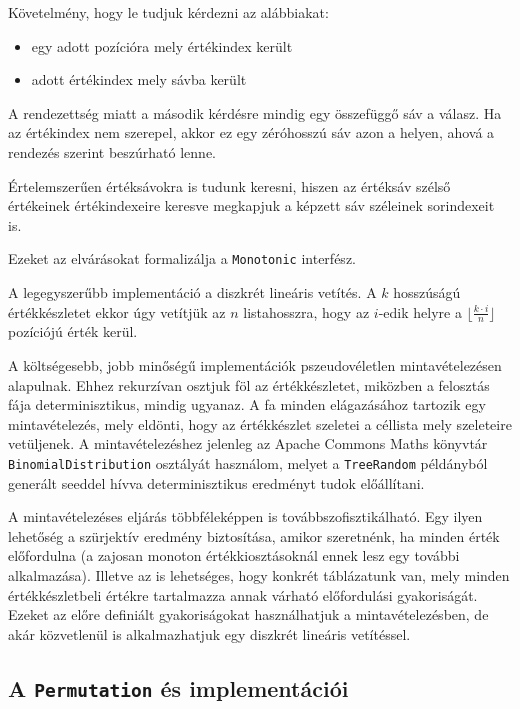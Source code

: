 \documentclass[
    parspace,
    noindent,
    nohyp,
]{elteiktdk}[2023/04/10]
\begin{document}
Követelmény, hogy le tudjuk kérdezni az alábbiakat:

\begin{itemize}
    \item egy adott pozícióra mely értékindex került
    \item adott értékindex mely sávba került
\end{itemize}

A rendezettség miatt a második kérdésre mindig egy összefüggő sáv a válasz. Ha az értékindex nem szerepel, akkor ez egy zéróhosszú sáv azon a helyen, ahová a rendezés szerint beszúrható lenne.

Értelemszerűen értéksávokra is tudunk keresni, hiszen az értéksáv szélső értékeinek értékindexeire keresve megkapjuk a képzett sáv széleinek sorindexeit is.

Ezeket az elvárásokat formalizálja a \texttt{Monotonic} interfész.

A legegyszerűbb implementáció a diszkrét lineáris vetítés.
A $k$ hosszúságú értékkészletet ekkor úgy vetítjük az $n$ listahosszra,
hogy az $i$-edik helyre a $\lfloor \frac{k \cdot i}{n} \rfloor$ pozíciójú érték kerül.

A költségesebb, jobb minőségű implementációk pszeudovéletlen mintavételezésen alapulnak.
Ehhez rekurzívan osztjuk föl az értékkészletet, miközben a felosztás fája determinisztikus, mindig ugyanaz.
A fa minden elágazásához tartozik egy mintavételezés, mely eldönti,
hogy az értékkészlet szeletei a céllista mely szeleteire vetüljenek.
A mintavételezéshez jelenleg az Apache Commons Maths könyvtár
\texttt{BinomialDistribution} osztályát használom,
melyet a \texttt{TreeRandom} példányból generált seeddel hívva
determinisztikus eredményt tudok előállítani.

A mintavételezéses eljárás többféleképpen is továbbszofisztikálható.
Egy ilyen lehetőség a szürjektív eredmény biztosítása, amikor szeretnénk, ha minden érték előfordulna
(a zajosan monoton értékkiosztásoknál ennek lesz egy további alkalmazása).
Illetve az is lehetséges, hogy konkrét táblázatunk van,
mely minden értékkészletbeli értékre tartalmazza annak várható előfordulási gyakoriságát.
Ezeket az előre definiált gyakoriságokat használhatjuk a mintavételezésben,
de akár közvetlenül is alkalmazhatjuk egy diszkrét lineáris vetítéssel.

\subsection{A \texttt{Permutation} és implementációi}
\end{document}

